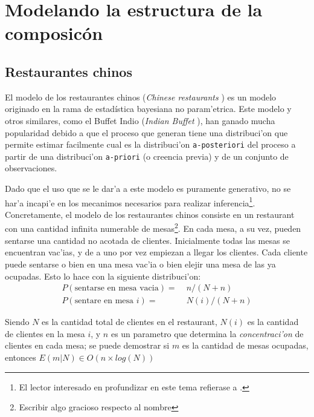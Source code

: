 \section{Modelando la estructura de la composic\'on}

\subsection{Restaurantes chinos}
El modelo de los restaurantes chinos (\emph{Chinese restaurants} \cita) es un modelo originado en la rama de estad\'istica bayesiana no param'etrica.
Este modelo y otros similares, como el Buffet Indio (\emph{Indian Buffet} \cita), han ganado mucha popularidad debido a que el proceso que generan
tiene una distribuci'on que permite estimar facilmente cual es la distribuci'on \texttt{a-posteriori} del proceso a partir de una distribuci'on 
\texttt{a-priori} (o creencia previa) y de un conjunto de observaciones.

Dado que el uso que se le dar'a a este modelo es puramente generativo, no se har'a incapi'e en los mecanimos necesarios para realizar inferencia\footnote{El lector interesado en profundizar en este tema refierase a \cita.}.
Concretamente, el modelo de los restaurantes chinos consiste en un restaurant con una cantidad infinita numerable de mesas\footnote{Escribir algo gracioso respecto al nombre}. 
En cada mesa, a su vez, pueden sentarse una cantidad no acotada de clientes. Inicialmente todas las mesas se encuentran vac'ias, 
y de a uno por vez empiezan a llegar los clientes. Cada cliente puede sentarse o bien en una mesa vac'ia o bien elejir una mesa de las ya ocupadas. 
Esto lo hace con la siguiente distribuci'on:
\begin{align}
P(\text{sentarse en mesa vacia}) =&\; n/(N + n)\\
P(\text{sentare en mesa } i) =&\; N(i)/(N + n)
\end{align}

Siendo $N$ es la cantidad total de clientes en el restaurant, $N(i)$ es la cantidad de clientes en la mesa $i$, y $n$ es un 
parametro que determina la \emph{concentraci'on} de clientes en cada mesa; se puede demostrar si $m$ es la cantidad de mesas ocupadas, entonces
$E(m|N) \in O(n\times log(N))$ 

